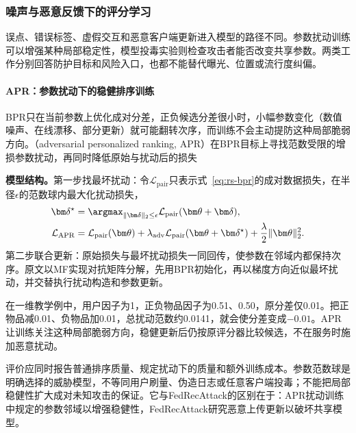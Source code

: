 \subsubsection{噪声与恶意反馈下的评分学习}
\label{sec:rs-robust-scoring}

误点、错误标签、虚假交互和恶意客户端更新进入模型的路径不同。参数扰动训练可以增强某种局部稳定性，模型投毒实验则检查攻击者能否改变共享参数。两类工作分别回答防护目标和风险入口，也都不能替代曝光、位置或流行度纠偏。

\paragraph{APR：参数扰动下的稳健排序训练}
\label{sec:rs-apr}

BPR只在当前参数上优化成对分差，正负候选分差很小时，小幅参数变化（数值噪声、在线漂移、部分更新）就可能翻转次序，而训练不会主动提防这种局部脆弱方向。（adversarial personalized ranking, APR）在BPR目标上寻找范数受限的增损参数扰动，再同时降低原始与扰动后的损失

\textbf{模型结构。}第一步找最坏扰动：令$\mathcal L_{\mathrm{pair}}$只表示式~\eqref{eq:rs-bpr}的成对数据损失，在半径$\epsilon$的范数球内最大化扰动损失，
\begin{align}
 \bm\delta^\star&=\argmax_{\lVert\bm\delta\rVert_2\leq\epsilon}
       \mathcal L_{\mathrm{pair}}(\bm\theta+\bm\delta),\\
 \mathcal L_{\mathrm{APR}}
   &=\mathcal L_{\mathrm{pair}}(\bm\theta)
     +\lambda_{\mathrm{adv}}
       \mathcal L_{\mathrm{pair}}(\bm\theta+\bm\delta^\star)
       +\frac{\lambda}{2}\lVert\bm\theta\rVert_2^2.
 \label{eq:rs-apr}
\end{align}
第二步联合更新：原始损失与最坏扰动损失一同回传，使参数在邻域内都保持次序。原文以MF实现对抗矩阵分解，先用BPR初始化，再以梯度方向近似最坏扰动，并交替执行扰动构造和参数更新。

在一维教学例中，用户因子为1，正负物品因子为0.51、0.50，原分差仅0.01。把正物品减0.01、负物品加0.01，总扰动范数约0.0141，就会使分差变成$-0.01$。APR让训练关注这种局部脆弱方向，稳健更新后仍按原评分器比较候选，不在服务时施加恶意扰动。

评价应同时报告普通排序质量、规定扰动下的质量和额外训练成本。参数范数球是明确选择的威胁模型，不等同用户刷量、伪造日志或任意客户端投毒；不能把局部稳健性扩大成对未知攻击的保证。它与FedRecAttack的区别在于：APR扰动训练中规定的参数邻域以增强稳健性，FedRecAttack研究恶意上传更新以破坏共享模型。

